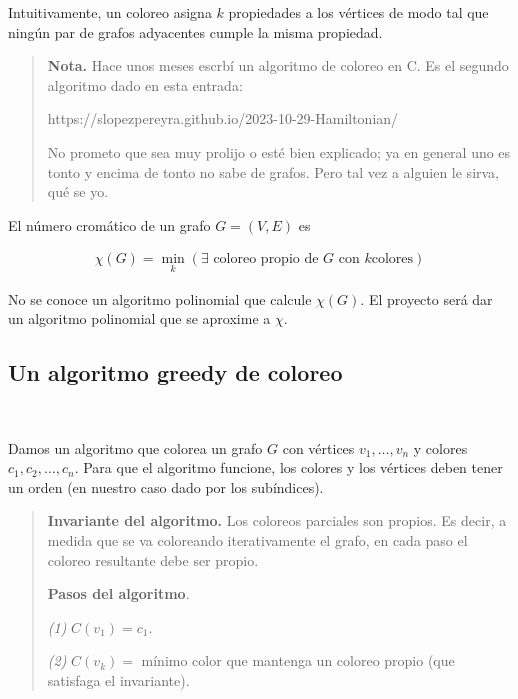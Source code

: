 \documentclass[a4paper]{article}
\begin{document}
Intuitivamente, un coloreo asigna $k$ propiedades a los vértices de modo tal que
ningún par de grafos adyacentes cumple la misma propiedad. 

\small
\begin{quote}

\textbf{Nota.} Hace unos meses escrbí un algoritmo de coloreo en C. Es el
segundo algoritmo dado en esta entrada: 

https://slopezpereyra.github.io/2023-10-29-Hamiltonian/

No prometo que sea muy prolijo o esté bien explicado; ya en general uno es tonto
y encima de tonto no sabe de grafos. Pero tal vez a alguien le sirva, qué se yo.

\end{quote}
\normalsize


\begin{definition}
    El número cromático de un grafo $G= (V, E) $ es 

    \begin{align*}
        \chi(G) = \min_k \left( \exists \text{ coloreo propio de $G$ con $k$
        colores} \right) 
    \end{align*}
\end{definition}

No se conoce un algoritmo polinomial que calcule $\chi(G)$. El proyecto será dar
un algoritmo polinomial que se aproxime a $\chi$.

\subsection{Un algoritmo greedy de coloreo}
~ ~ 

Damos un algoritmo que colorea un grafo $G$ con vértices $v_1, \ldots, v_n$ y
colores $ c_1, c_2, \ldots, c_n  $. Para que el algoritmo
funcione, los colores y los vértices deben tener un orden (en nuestro caso
dado por los subíndices).


\begin{quote}

\textbf{Invariante del algoritmo.} Los coloreos parciales son propios. Es decir,
a medida que se va coloreando iterativamente el grafo, en cada paso el coloreo
resultante debe ser propio.

\textbf{Pasos del algoritmo}. 

\textit{(1)} $C(v_1) = c_1$.

\textit{(2)} $C(v_k) = $ mínimo color que mantenga un coloreo propio (que
satisfaga el invariante).

\end{quote}
\end{document}

